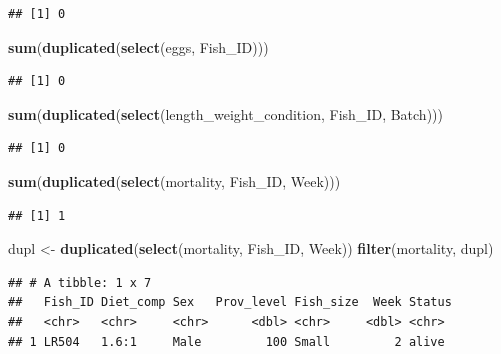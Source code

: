 \documentclass[]{book}
\newenvironment{Shaded}{\begin{snugshade}}{\end{snugshade}}
\newcommand{\KeywordTok}[1]{\textcolor[rgb]{0.13,0.29,0.53}{\textbf{#1}}}
\newcommand{\NormalTok}[1]{#1}
\newcommand{\StringTok}[1]{\textcolor[rgb]{0.31,0.60,0.02}{#1}}
\begin{document}
\begin{verbatim}
## [1] 0
\end{verbatim}

\begin{Shaded}
\begin{Highlighting}[]
\KeywordTok{sum}\NormalTok{(}\KeywordTok{duplicated}\NormalTok{(}\KeywordTok{select}\NormalTok{(eggs, Fish_ID)))}
\end{Highlighting}
\end{Shaded}

\begin{verbatim}
## [1] 0
\end{verbatim}

\begin{Shaded}
\begin{Highlighting}[]
\KeywordTok{sum}\NormalTok{(}\KeywordTok{duplicated}\NormalTok{(}\KeywordTok{select}\NormalTok{(length_weight_condition, Fish_ID, Batch)))}
\end{Highlighting}
\end{Shaded}

\begin{verbatim}
## [1] 0
\end{verbatim}

\begin{Shaded}
\begin{Highlighting}[]
\KeywordTok{sum}\NormalTok{(}\KeywordTok{duplicated}\NormalTok{(}\KeywordTok{select}\NormalTok{(mortality, Fish_ID, Week)))}
\end{Highlighting}
\end{Shaded}

\begin{verbatim}
## [1] 1
\end{verbatim}

\begin{Shaded}
\begin{Highlighting}[]
\NormalTok{dupl <-}\StringTok{ }\KeywordTok{duplicated}\NormalTok{(}\KeywordTok{select}\NormalTok{(mortality, Fish_ID, Week))}
\KeywordTok{filter}\NormalTok{(mortality, dupl)}
\end{Highlighting}
\end{Shaded}

\begin{verbatim}
## # A tibble: 1 x 7
##   Fish_ID Diet_comp Sex   Prov_level Fish_size  Week Status
##   <chr>   <chr>     <chr>      <dbl> <chr>     <dbl> <chr> 
## 1 LR504   1.6:1     Male         100 Small         2 alive
\end{verbatim}
\end{document}
